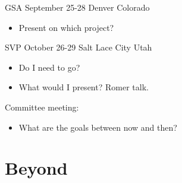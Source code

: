 \documentclass{article}
\begin{document}
GSA September 25-28 Denver Colorado
\begin{itemize}
  \item Present on which project?
\end{itemize}

SVP October 26-29 Salt Lace City Utah
\begin{itemize}
  \item Do I need to go?
  \item What would I present? Romer talk.
\end{itemize}

Committee meeting:
\begin{itemize}
  \item What are the goals between now and then?
\end{itemize}


\section{Beyond}
\end{document}

